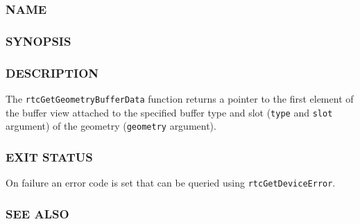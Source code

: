 \subsubsection{NAME}\label{name}

\begin{Shaded}
\begin{Highlighting}[]
\OperatorTok{{-}}
\end{Highlighting}
\end{Shaded}

\subsubsection{SYNOPSIS}\label{synopsis}

\begin{Shaded}
\begin{Highlighting}[]

\OperatorTok{*}\OperatorTok{(}
\OperatorTok{,}
  \OperatorTok{,}
   
\OperatorTok{);}
\end{Highlighting}
\end{Shaded}

\subsubsection{DESCRIPTION}\label{description}

The \texttt{rtcGetGeometryBufferData} function returns a pointer to the
first element of the buffer view attached to the specified buffer type
and slot (\texttt{type} and \texttt{slot} argument) of the geometry
(\texttt{geometry} argument).

\subsubsection{EXIT STATUS}\label{exit-status}

On failure an error code is set that can be queried using
\texttt{rtcGetDeviceError}.

\subsubsection{SEE ALSO}\label{see-also}

